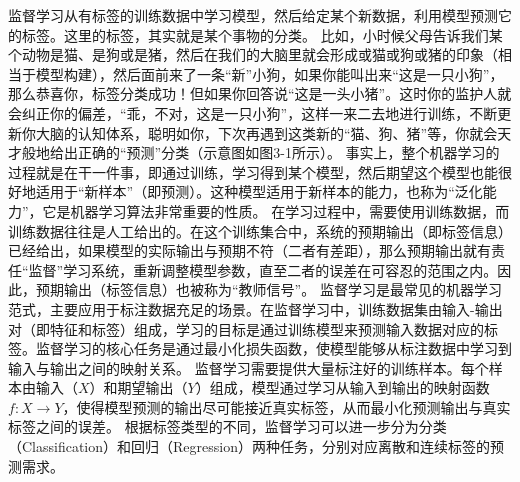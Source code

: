 
监督学习从有标签的训练数据中学习模型，然后给定某个新数据，利用模型预测它的标签。这里的标签，其实就是某个事物的分类。
比如，小时候父母告诉我们某个动物是猫、是狗或是猪，然后在我们的大脑里就会形成或猫或狗或猪的印象（相当于模型构建），然后面前来了一条“新”小狗，如果你能叫出来“这是一只小狗”，那么恭喜你，标签分类成功！但如果你回答说“这是一头小猪”。这时你的监护人就会纠正你的偏差，“乖，不对，这是一只小狗”，这样一来二去地进行训练，不断更新你大脑的认知体系，聪明如你，下次再遇到这类新的“猫、狗、猪”等，你就会天才般地给出正确的“预测”分类（示意图如图3-1所示）。
事实上，整个机器学习的过程就是在干一件事，即通过训练，学习得到某个模型，然后期望这个模型也能很好地适用于“新样本”（即预测）。这种模型适用于新样本的能力，也称为“泛化能力”，它是机器学习算法非常重要的性质。
在学习过程中，需要使用训练数据，而训练数据往往是人工给出的。在这个训练集合中，系统的预期输出（即标签信息）已经给出，如果模型的实际输出与预期不符（二者有差距），那么预期输出就有责任“监督”学习系统，重新调整模型参数，直至二者的误差在可容忍的范围之内。因此，预期输出（标签信息）也被称为“教师信号”。
监督学习是最常见的机器学习范式，主要应用于标注数据充足的场景。在监督学习中，训练数据集由输入-输出对（即特征和标签）组成，学习的目标是通过训练模型来预测输入数据对应的标签。监督学习的核心任务是通过最小化损失函数，使模型能够从标注数据中学习到输入与输出之间的映射关系。
监督学习需要提供大量标注好的训练样本。每个样本由输入（$X$）和期望输出（$Y$）组成，模型通过学习从输入到输出的映射函数$f: X \rightarrow Y$，使得模型预测的输出尽可能接近真实标签，从而最小化预测输出与真实标签之间的误差。
根据标签类型的不同，监督学习可以进一步分为分类（Classification）和回归（Regression）两种任务，分别对应离散和连续标签的预测需求。

